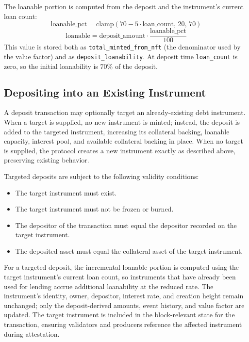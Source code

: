 \documentclass[11pt,a4paper]{article}
\begin{document}
The loanable portion is computed from the deposit and the instrument's current loan count:
\begin{equation}
\text{loanable\_pct} = \mathrm{clamp}(70 - 5\cdot \text{loan\_count},\,20,\,70)
\end{equation}
\begin{equation}
\text{loanable} = \text{deposit\_amount} \cdot \frac{\text{loanable\_pct}}{100}
\end{equation}
This value is stored both as \texttt{total\_minted\_from\_nft} (the denominator used by the value factor) and as \texttt{deposit\_loanability}. At deposit time \texttt{loan\_count} is zero, so the initial loanability is $70\%$ of the deposit.

\subsection{Depositing into an Existing Instrument}
A deposit transaction may optionally target an already-existing debt instrument. When a target is supplied, no new instrument is minted; instead, the deposit is added to the targeted instrument, increasing its collateral backing, loanable capacity, interest pool, and available collateral backing in place. When no target is supplied, the protocol creates a new instrument exactly as described above, preserving existing behavior.

Targeted deposits are subject to the following validity conditions:
\begin{itemize}
\item The target instrument must exist.
\item The target instrument must not be frozen or burned.
\item The depositor of the transaction must equal the depositor recorded on the target instrument.
\item The deposited asset must equal the collateral asset of the target instrument.
\end{itemize}

For a targeted deposit, the incremental loanable portion is computed using the target instrument's current loan count, so instruments that have already been used for lending accrue additional loanability at the reduced rate. The instrument's identity, owner, depositor, interest rate, and creation height remain unchanged; only the deposit-derived amounts, event history, and value factor are updated. The target instrument is included in the block-relevant state for the transaction, ensuring validators and producers reference the affected instrument during attestation.
\end{document}
